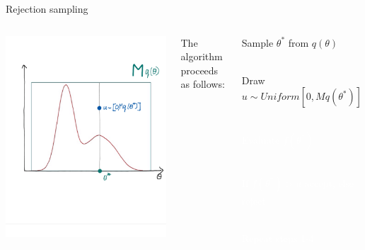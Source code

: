 \documentclass[compress]{beamer}
\begin{document}
\begin{frame}[label=sec-5-5]{Rejection sampling}
    \begin{columns}[c] 
    \includegraphics[width=1\linewidth]{RS4}

    The algorithm proceeds as follows:\\
    \begin{enumerate}
        \item Sample $\theta^*$ from $q(\theta)$ \\~\\
        \item Draw $u \sim Uniform[0, Mq(\theta^*)]$ \\~\\
        \textcolor{white}{
            \item[\color{white}] Evaluate $f(\theta^*)$ \\~\\
            \item[\color{white}]If $f(\theta^*) > u$ accept, else reject \\~\\
            \item[\color{white}] Repeat steps 1-4
        }
    \end{enumerate}
\end{columns}
\end{frame}
\end{document}
